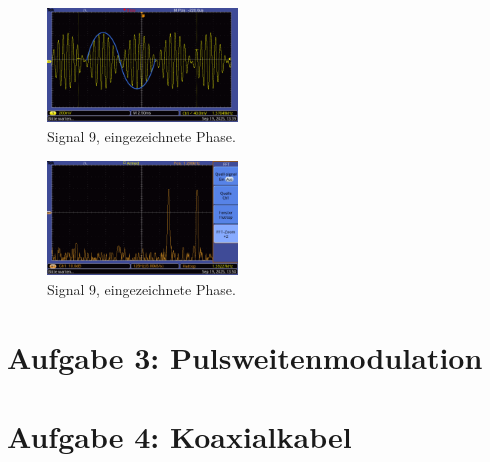 \begin{figure} [h!]
    \centering
        \includegraphics[width=0.45\textwidth]{img/25/Signale2/Signal9-Sin-eingezeichnet.pdf}
    \caption{Signal 9, eingezeichnete Phase.}
\end{figure}

\begin{figure} [h!]
    \centering
        \includegraphics[width=0.45\textwidth]{img/25/Signale2/Sig9-FFT.pdf}
    \caption{Signal 9, eingezeichnete Phase.}
\end{figure}



\newpage
\onecolumn
\twocolumn


\section{Aufgabe 3: Pulsweitenmodulation}

\section{Aufgabe 4: Koaxialkabel}
